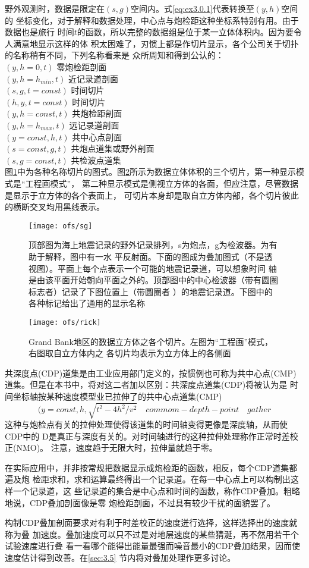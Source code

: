 野外观测时，数据是限定在$(s,g)$空间内。式\ref{eq:ex3.0.1}代表转换至$(y,h)$空间的
坐标变化，对于解释和数据处理，中心点与炮检距这种坐标系特别有用。由于数据也是旅行
时间$t$的函数，所以完整的数据组是位于某一立体体积内。因为要令人满意地显示这样的体
积太困难了，刃惯上都是作切片显示，各个公司关于切扑的名称稍有不同，下列名称看来是
众所周知和得到公认的：\\
$(y,h=0,t)$  零炮检距剖面 \\
$(y,h=h_{min},t)$  近记录道剖面\\
$(s,g,t=const)$  时间切片\\
$(h,y,t=const)$  时间切片\\
$(y,h=const,t)$  共炮检距剖面\\
$(y,h=h_{max},t)$  远记录道剖面\\
$(y=const,h,t)$  共中心点剖面\\
$(s=const,g,t)$  共炮点道集或野外剖面\\
$(s,g=const,t)$  共检波点道集\\

图\ref{fig:ofs/sg}中为各种名称切片的图式。图\ref{fig:ofs/rick}所示为数据立体体积的三个切片，第一种显示模式是“工程画模式”，
第二种显示模式是侧视立方体的各面，但应注意，尽管数据是显示于立方体的各个表面上，
可切片本身却是取自立方体内部，各个切片彼此的横断交叉均用黑线表示。
\begin{figure}[H]
\centering
\texttt{[image: ofs/sg]}
\caption[sg]{顶部图为海上地震记录的野外记录排列，s为炮点，g为检波器。为有助于解释，图中有一水
平反射面。下面的图成为叠加图式（不是透视图）。平面上每个点表示一个可能的地震记录道，可以想象时间
轴是由该平面开始朝向平面之外的。顶部图中的中心检波器（带有圆圈标志者）记录了下图位置上（带圆圈者
）的地震记录道。下图中的各种标记给出了通用的显示名称}
\label{fig:ofs/sg}
\end{figure}

\begin{figure}[H]
\centering
\texttt{[image: ofs/rick]}
\caption[rick]{Grand Bank地区的数据立方体之各个切片。左图为“工程画”模式，右图取自立方体内之
各切片均表示为立方体上的各侧面}
\label{fig:ofs/rick}
\end{figure}
共深度点(CDP)道集是由工业应用部门定义的，按惯例也可称为共中心点(CMP)
道集。但是在本书中，将对这二者加以区别：共深度点道集(CDP)将被认为是
时间坐标轴按某种速度模型业已拉伸了的共中心点道集(CMP)
\begin{equation*}
(y=const,h,\sqrt{t^2-4h^2/v^2} \quad commom-depth-point\quad gather
\end{equation*}
这种与炮检点有关的拉伸处理使得该道集的时间轴变得更像是深度轴，从而使CDP中的
D是真正与深度有关的。对时间轴进行的这种拉伸处理称作正常时差校正(NMO)。
注意，速度趋于无限大时，拉伸量就趋于零。

在实际应用中，并非按常规把数据显示成炮检距的函数，相反，每个CDP道集都遍及炮
检距求和，求和运算最终得出一个记录道。在每一中心点上可以构制出这样一个记录道，这
些记录道的集合是中心点和时间的函数，称作CDP叠加。粗略地说，CDP叠加剖面像是零
炮检距剖面，不过具有较少干扰的面貌罢了。

构制CDP叠加剖面要求对有利于时差校正的速度迸行选择，这样选择出的速度就称为叠
加速度。叠加速度可以只不过是对地层速度的某些猜涎，再不然用若干个试验速度进行叠
看一看哪个能得出能量最强而噪音最小的CDP叠加结果，因而使速度估计得到改善。在\ref{sec:3.5}
节内将对叠加处理作更多讨论。

